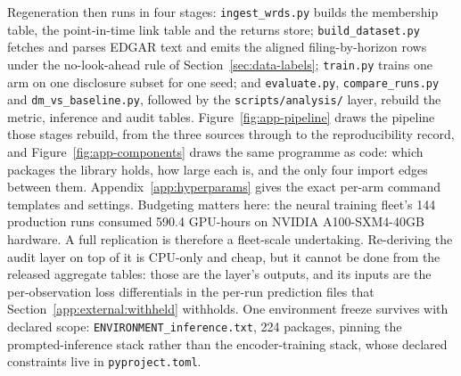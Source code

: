 Regeneration then runs in four stages: \texttt{ingest\_wrds.py} builds the
membership table, the point-in-time link table and the returns store;
\texttt{build\_dataset.py} fetches and parses EDGAR text and emits the aligned
filing-by-horizon rows under the no-look-ahead rule of
Section~\ref{sec:data-labels}; \texttt{train.py} trains one arm on one disclosure
subset for one seed; and \texttt{evaluate.py}, \texttt{compare\_runs.py} and
\texttt{dm\_vs\_baseline.py}, followed by the \texttt{scripts/analysis/} layer,
rebuild the metric, inference and audit tables.
Figure~\ref{fig:app-pipeline} draws the pipeline those stages rebuild, from the
three sources through to the reproducibility record, and
Figure~\ref{fig:app-components} draws the same programme as code: which
packages the library holds, how large each is, and the only four import edges
between them.
Appendix~\ref{app:hyperparams}
gives the exact per-arm command templates and settings. Budgeting matters here:
the neural training fleet's 144 production runs consumed 590.4 GPU-hours on
NVIDIA A100-SXM4-40GB hardware. %
A full replication is therefore a fleet-scale undertaking. Re-deriving the audit
layer on top of it is CPU-only and cheap, but it cannot be done from the
released aggregate tables: those are the layer's outputs, and its inputs are the
per-observation loss differentials in the per-run prediction files that
Section~\ref{app:external:withheld} withholds. One
environment freeze survives with declared scope: \texttt{ENVIRONMENT\_inference.txt},
224 packages, pinning the prompted-inference stack rather than the
encoder-training stack, whose declared constraints live in
\texttt{pyproject.toml}. %

